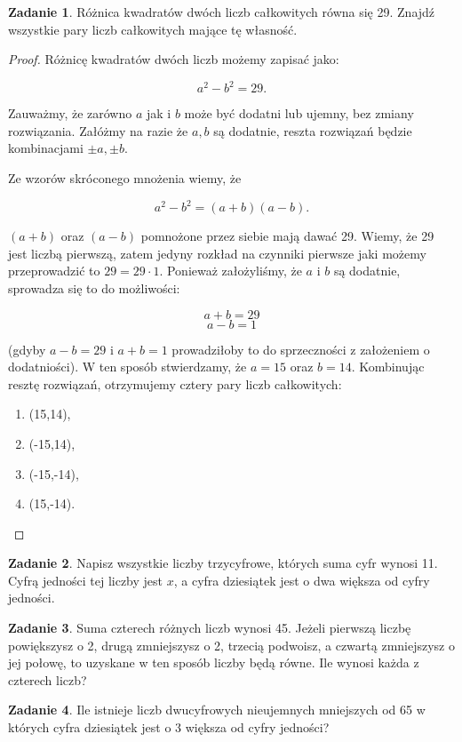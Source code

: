 \documentclass[11pt]{article}
\theoremstyle{definition}
\newtheorem{zad}{Zadanie}
\begin{document}
\begin{zad}
Różnica kwadratów dwóch liczb całkowitych równa się 29. Znajdź wszystkie pary liczb całkowitych mające tę własność.
\end{zad}
\begin{proof}
Różnicę kwadratów dwóch liczb możemy zapisać jako:

$$a^2 - b^2 = 29.$$

Zauważmy, że zarówno $a$ jak i $b$ może być dodatni lub ujemny, bez zmiany rozwiązania. Załóżmy na razie że $a, b$ są dodatnie, reszta rozwiązań będzie kombinacjami $\pm a, \pm b$.

Ze wzorów skróconego mnożenia wiemy, że 

$$a^2-b^2 = (a+b)(a-b).$$

$(a+b)$ oraz $(a-b)$ pomnożone przez siebie mają dawać 29. Wiemy, że 29 jest liczbą pierwszą, zatem jedyny rozkład na czynniki pierwsze jaki możemy przeprowadzić to $29 = 29\cdot 1$. Ponieważ założyliśmy, że $a$ i $b$ są dodatnie, sprowadza się to do możliwości:

$$a+b = 29$$
$$a-b = 1$$

(gdyby $a-b=29$ i $a+b=1$ prowadziłoby to do sprzeczności z założeniem o dodatniości). W ten sposób stwierdzamy, że $a = 15$ oraz $b= 14$. Kombinując resztę rozwiązań, otrzymujemy cztery pary liczb całkowitych:
\begin{enumerate}
\item (15,14),
\item (-15,14),
\item (-15,-14),
\item (15,-14).
\end{enumerate}
\end{proof}

\begin{zad}
Napisz wszystkie liczby trzycyfrowe, których suma cyfr wynosi 11. Cyfrą jedności tej liczby jest $x$, a cyfra dziesiątek jest o dwa większa od cyfry jedności.
\end{zad}

\begin{zad}
Suma czterech różnych liczb wynosi 45. Jeżeli pierwszą liczbę powiększysz o 2, drugą zmniejszysz o 2, trzecią podwoisz, a czwartą zmniejszysz o jej połowę, to uzyskane w ten sposób liczby będą równe. Ile wynosi każda z czterech liczb?
\end{zad}

\begin{zad}
Ile istnieje liczb dwucyfrowych nieujemnych mniejszych od 65 w których cyfra dziesiątek jest o 3 większa od cyfry jedności?
\end{zad}
\end{document}
